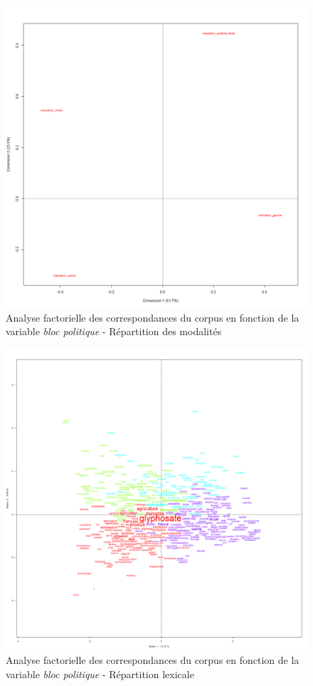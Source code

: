 \documentclass[12pt,twocolumn,landscape]{article}
\begin{document}
    \begin{figure}[p]
        \centering
        \includegraphics[width=\linewidth]{afcf_col}
        \caption{
            Analyse factorielle des correspondances du corpus en fonction
            de la variable \textit{bloc politique} - Répartition des modalités
        }
        \label{fig:afc-modalites}
    \end{figure}
    \begin{figure}[p]
        \centering
        \includegraphics[width=\linewidth]{graph_afc_1}
        \caption{
            Analyse factorielle des correspondances du corpus en fonction de la variable \textit{bloc politique}
            - Répartition lexicale
        }
        \label{fig:afc-lexical}
    \end{figure}
\end{document}
